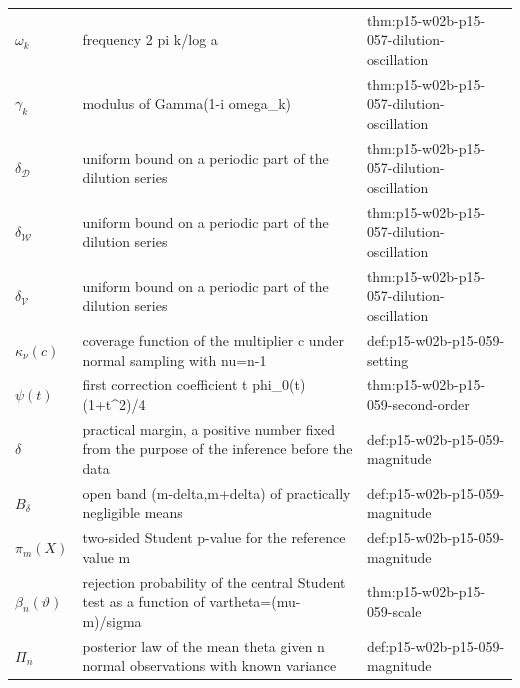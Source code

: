 \begin{longtable}{@{}p{}p{}p{}@{}}
\(\omega_k\) & frequency 2 pi k/log a & thm:\allowbreak{}p15-\allowbreak{}w02b-\allowbreak{}p15-\allowbreak{}057-\allowbreak{}dilution-\allowbreak{}oscillation \\
\(\gamma_k\) & modulus of Gamma(1-i omega\_k) & thm:\allowbreak{}p15-\allowbreak{}w02b-\allowbreak{}p15-\allowbreak{}057-\allowbreak{}dilution-\allowbreak{}oscillation \\
\(\delta_{\mathcal D}\) & uniform bound on a periodic part of the dilution series & thm:\allowbreak{}p15-\allowbreak{}w02b-\allowbreak{}p15-\allowbreak{}057-\allowbreak{}dilution-\allowbreak{}oscillation \\
\(\delta_{\mathcal W}\) & uniform bound on a periodic part of the dilution series & thm:\allowbreak{}p15-\allowbreak{}w02b-\allowbreak{}p15-\allowbreak{}057-\allowbreak{}dilution-\allowbreak{}oscillation \\
\(\delta_{\mathcal V}\) & uniform bound on a periodic part of the dilution series & thm:\allowbreak{}p15-\allowbreak{}w02b-\allowbreak{}p15-\allowbreak{}057-\allowbreak{}dilution-\allowbreak{}oscillation \\
\(\kappa_\nu(c)\) & coverage function of the multiplier c under normal sampling with nu=n-1 & def:\allowbreak{}p15-\allowbreak{}w02b-\allowbreak{}p15-\allowbreak{}059-\allowbreak{}setting \\
\(\psi(t)\) & first correction coefficient t phi\_0(t)(1+t\^{}2)/4 & thm:\allowbreak{}p15-\allowbreak{}w02b-\allowbreak{}p15-\allowbreak{}059-\allowbreak{}second-\allowbreak{}order \\
\(\delta\) & practical margin, a positive number fixed from the purpose of the inference before the data & def:\allowbreak{}p15-\allowbreak{}w02b-\allowbreak{}p15-\allowbreak{}059-\allowbreak{}magnitude \\
\(B_\delta\) & open band (m-delta,m+delta) of practically negligible means & def:\allowbreak{}p15-\allowbreak{}w02b-\allowbreak{}p15-\allowbreak{}059-\allowbreak{}magnitude \\
\(\pi_m(X)\) & two-sided Student p-value for the reference value m & def:\allowbreak{}p15-\allowbreak{}w02b-\allowbreak{}p15-\allowbreak{}059-\allowbreak{}magnitude \\
\(\beta_n(\vartheta)\) & rejection probability of the central Student test as a function of vartheta=(mu-m)/sigma & thm:\allowbreak{}p15-\allowbreak{}w02b-\allowbreak{}p15-\allowbreak{}059-\allowbreak{}scale \\
\(\Pi_n\) & posterior law of the mean theta given n normal observations with known variance & def:\allowbreak{}p15-\allowbreak{}w02b-\allowbreak{}p15-\allowbreak{}059-\allowbreak{}magnitude \\

\end{longtable}

